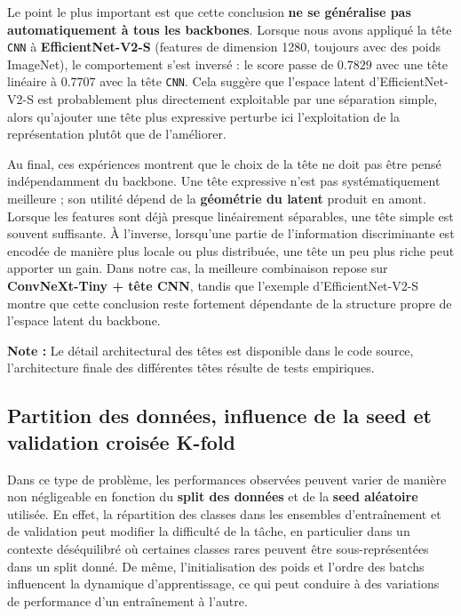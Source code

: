 \documentclass[journal,twocolumn]{IEEEtran}
\begin{document}
Le point le plus important est que cette conclusion \textbf{ne se généralise pas automatiquement à tous les backbones}. Lorsque nous avons appliqué la tête \texttt{CNN} à \textbf{EfficientNet-V2-S} (features de dimension 1280, toujours avec des poids ImageNet), le comportement s’est inversé : le score passe de $0.7829$ avec une tête linéaire à $0.7707$ avec la tête \texttt{CNN}. Cela suggère que l’espace latent d’EfficientNet-V2-S est probablement plus directement exploitable par une séparation simple, alors qu’ajouter une tête plus expressive perturbe ici l’exploitation de la représentation plutôt que de l’améliorer.

Au final, ces expériences montrent que le choix de la tête ne doit pas être pensé indépendamment du backbone. Une tête expressive n’est pas systématiquement meilleure ; son utilité dépend de la \textbf{géométrie du latent} produit en amont. Lorsque les features sont déjà presque linéairement séparables, une tête simple est souvent suffisante. À l’inverse, lorsqu’une partie de l’information discriminante est encodée de manière plus locale ou plus distribuée, une tête un peu plus riche peut apporter un gain. Dans notre cas, la meilleure combinaison repose sur \textbf{ConvNeXt-Tiny + tête CNN}, tandis que l’exemple d’EfficientNet-V2-S montre que cette conclusion reste fortement dépendante de la structure propre de l’espace latent du backbone.

\textbf{Note :} Le détail architectural des têtes est disponible dans le code source, l'architecture finale des différentes têtes résulte de tests empiriques.

\subsection{Partition des données, influence de la seed et validation croisée K-fold}

Dans ce type de problème, les performances observées peuvent varier de manière non négligeable en fonction du \textbf{split des données} et de la \textbf{seed aléatoire} utilisée. En effet, la répartition des classes dans les ensembles d’entraînement et de validation peut modifier la difficulté de la tâche, en particulier dans un contexte déséquilibré où certaines classes rares peuvent être sous-représentées dans un split donné. De même, l’initialisation des poids et l’ordre des batchs influencent la dynamique d’apprentissage, ce qui peut conduire à des variations de performance d’un entraînement à l’autre.
\end{document}
